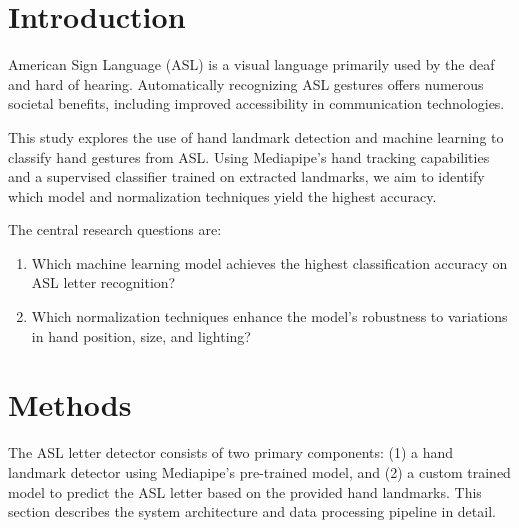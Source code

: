 \documentclass{article}
\begin{document}

\section{Introduction}
American Sign Language (ASL) is a visual language primarily used by the deaf and hard of hearing. Automatically recognizing ASL gestures offers numerous societal benefits, including improved accessibility in communication technologies.

This study explores the use of hand landmark detection and machine learning to classify hand gestures from ASL. Using Mediapipe's hand tracking capabilities and a supervised classifier trained on extracted landmarks, we aim to identify which model and normalization techniques yield the highest accuracy.

The central research questions are:
\begin{enumerate}
    \item Which machine learning model achieves the highest classification accuracy on ASL letter recognition?
    \item Which normalization techniques enhance the model's robustness to variations in hand position, size, and lighting?
\end{enumerate}

\section{Methods}
The ASL letter detector consists of two primary components:
(1) a hand landmark detector using Mediapipe's pre-trained
model, and (2) a custom trained model to predict the ASL
letter based on the provided hand landmarks. This section
describes the system architecture and data processing pipeline
in detail.
\end{document}
